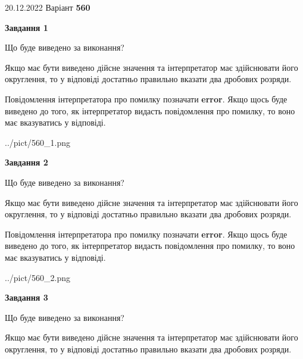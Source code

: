 \documentclass[12pt, ukrainian]{article}
\begin{document}
{20.12.2022 Варіант \No \textbf { 560 }\par}
{
\begin {Large}

{\begin {center}\textbf{Завдання 1}\end {center}}\par
Що буде виведено за виконання? \par

Якщо має бути виведено дійсне значення та інтерпретатор має здійснювати його округлення, 
то у відповіді достатньо правильно вказати два дробових розряди.

Повідомлення інтерпретатора про помилку позначати \textbf{error}.
Якщо щось буде виведено до того, як інтерпретатор видасть повідомлення про помилку, 
то воно має вказуватись у відповіді. \par

\begin{center}
	{../pict/560_1.png}
\end{center}
\newpage

{\begin {center}\textbf{Завдання 2}\end {center}}\par
Що буде виведено за виконання? \par

Якщо має бути виведено дійсне значення та інтерпретатор має здійснювати його округлення, 
то у відповіді достатньо правильно вказати два дробових розряди.

Повідомлення інтерпретатора про помилку позначати \textbf{error}.
Якщо щось буде виведено до того, як інтерпретатор видасть повідомлення про помилку, 
то воно має вказуватись у відповіді. \par

\begin{center}
	{../pict/560_2.png}
\end{center}
\newpage

{\begin {center}\textbf{Завдання 3}\end {center}}\par
Що буде виведено за виконання? \par

Якщо має бути виведено дійсне значення та інтерпретатор має здійснювати його округлення, 
то у відповіді достатньо правильно вказати два дробових розряди.


\end{Large}}
\end{document}
